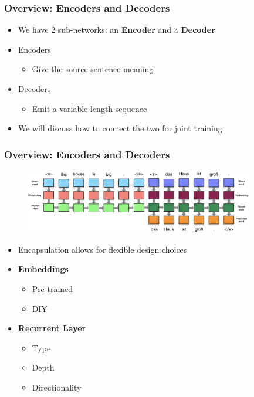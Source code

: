 \documentclass[usenames,dvipsnames]{beamer}
\begin{document}
\begin{frame}
\frametitle{Overview: Encoders and Decoders}
\begin{itemize}
  \item We have 2 sub-networks: an \textbf{Encoder} and a \textbf{Decoder}
  \item Encoders
  \begin{itemize}
    \item Give the source sentence meaning
  \end{itemize}
  \item Decoders
  \begin{itemize}
    \item Emit a variable-length sequence
  \end{itemize}
  \item We will discuss how to connect the two for joint training
\end{itemize}
\end{frame}

\begin{frame}
\frametitle{Overview: Encoders and Decoders}
\begin{figure}
  \centering
  \includegraphics[width=10cm, valign=c]{assets/enc-dec}
\end{figure}
\begin{itemize}
  \item Encapsulation allows for flexible design choices
  \item \textbf{Embeddings}
    \begin{itemize}
      \item Pre-trained
      \item DIY
    \end{itemize}
  \item \textbf{Recurrent Layer}
    \begin{itemize}
      \item Type
      \item Depth
      \item Directionality
    \end{itemize}
\end{itemize}
\end{frame}
\end{document}
